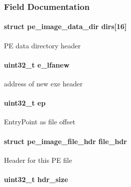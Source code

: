 \subsubsection{Field Documentation}
\hypertarget{structcli__pe__hook__data_aacc309d29c73dbd6ac72ee719e331097}{
\paragraph[{dirs}]{\setlength{\rightskip}{0pt plus 5cm}struct {\bf pe\_\-image\_\-data\_\-dir} {\bf dirs}\mbox{[}16\mbox{]}}\hfill}
\label{structcli__pe__hook__data_aacc309d29c73dbd6ac72ee719e331097}
PE data directory header \hypertarget{structcli__pe__hook__data_a3d0539adcc53a30b31c2a18bc8b84e00}{
\paragraph[{e\_\-lfanew}]{\setlength{\rightskip}{0pt plus 5cm}uint32\_\-t {\bf e\_\-lfanew}}\hfill}
\label{structcli__pe__hook__data_a3d0539adcc53a30b31c2a18bc8b84e00}
address of new exe header \hypertarget{structcli__pe__hook__data_afaed4671662028c061ab84eefcce0546}{
\paragraph[{ep}]{\setlength{\rightskip}{0pt plus 5cm}uint32\_\-t {\bf ep}}\hfill}
\label{structcli__pe__hook__data_afaed4671662028c061ab84eefcce0546}
EntryPoint as file offset \hypertarget{structcli__pe__hook__data_a3b996731cad79e0040fc0e4613d20533}{
\paragraph[{file\_\-hdr}]{\setlength{\rightskip}{0pt plus 5cm}struct {\bf pe\_\-image\_\-file\_\-hdr} {\bf file\_\-hdr}}\hfill}
\label{structcli__pe__hook__data_a3b996731cad79e0040fc0e4613d20533}
Header for this PE file \hypertarget{structcli__pe__hook__data_af2492dd421362ffced98eb583964b310}{
\paragraph[{hdr\_\-size}]{\setlength{\rightskip}{0pt plus 5cm}uint32\_\-t {\bf hdr\_\-size}}\hfill}
